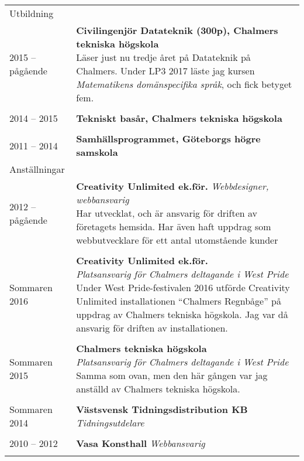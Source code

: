 \documentclass[letterpaper,11pt,oneside]{article}
\begin{document}
\noindent \begin{tabular}{@{} l l}
 \Large{Utbildning}   & \\
 2015 – pågående       & \parbox{5.0in}{\textbf{Civilingenjör Datateknik (300p), Chalmers tekniska högskola} 
                        \\Läser just nu tredje året på Datateknik på Chalmers. Under LP3 2017 läste jag kursen \textit{Matematikens domänspecifika språk}, och fick betyget fem.} \\
                      & \\
 2014 – 2015          & \textbf{Tekniskt basår, Chalmers tekniska högskola} \\
                      & \\
 2011 – 2014          & \textbf{Samhällsprogrammet, Göteborgs högre samskola}
                      & \\
 \Large{Anställningar}    & \\
 2012 – pågående & \parbox{5.0in}{\textbf{Creativity Unlimited ek.för.} \textit{Webbdesigner, webbansvarig} \\
                                  Har utvecklat, och är ansvarig för driften av företagets hemsida. Har även haft uppdrag som webbutvecklare för ett antal utomstående kunder  } \\
    & \\
Sommaren 2016 & \parbox{5.0in}{\textbf{Creativity Unlimited ek.för.} \\ \textit{Platsansvarig för Chalmers deltagande i West Pride} \\
                                Under West Pride-festivalen 2016 utförde Creativity Unlimited installationen ``Chalmers Regnbåge'' på uppdrag av Chalmers tekniska högskola. Jag var då ansvarig för driften av installationen.}\\

    & \\
                                Sommaren 2015 & \parbox{5.0in}{\textbf{Chalmers tekniska högskola} \\
                                \textit{Platsansvarig för Chalmers deltagande i West Pride} \\ 
                                Samma som ovan, men den här gången var jag anställd av Chalmers tekniska högskola.} \\
    & \\
                                Sommaren 2014 & \textbf{Västsvensk Tidningsdistribution KB} \textit{Tidningsutdelare} \\
    & \\
                                2010 – 2012 & \textbf{Vasa Konsthall} \textit{Webbansvarig} \\
    & \\


\end{tabular}
\end{document}
